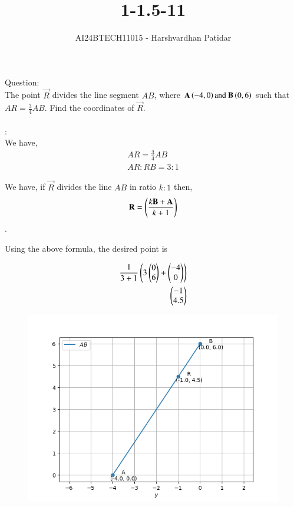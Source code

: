 \documentclass[journal]{IEEEtran}
\begin{document}

\vspace{3cm}

\title{1-1.5-11}
\author{AI24BTECH11015 - Harshvardhan Patidar}
{\let\newpage\relax\maketitle}

\renewcommand{\thefigure}{\theenumi}
\renewcommand{\thetable}{\theenumi}
\setlength{\intextsep}{10pt} %


\renewcommand{\thetable}{\theenumi}


	Question:\\
		The point $\vec{R}$ divides the line segment $AB$, where $\mathbf{A} \left(-4,0\right) \text{and } \mathbf{B} \left(0,6\right)$ such that $AR = \frac{3}{4}AB$. Find the coordinates of $\vec{R}$.
	\\
	\\
	\solution:\\

	We have,
	\begin{align}
		AR = \frac{3}{4} AB\\
		AR:RB = 3:1
	\end{align}

	We have, if $\vec{R}$ divides the line $AB$ in ratio $k:1$ then, $$\mathbf{R} = \left(\frac{k\mathbf{B} + \mathbf{A}}{k+1}\right)$$.

	Using the above formula, the desired point is

	\begin{align}
		\frac{1}{3+1}\left(3\begin{pmatrix}0\\6\end{pmatrix} + \begin{pmatrix}-4\\0\end{pmatrix}\right) \\
		\begin{pmatrix}-1\\4.5\end{pmatrix}
	\end{align}


	\begin{figure}[hbt!]
		\centering
		\includegraphics[width=0.6\linewidth]{figs/fig.png}
	\end{figure}
\end{document}
